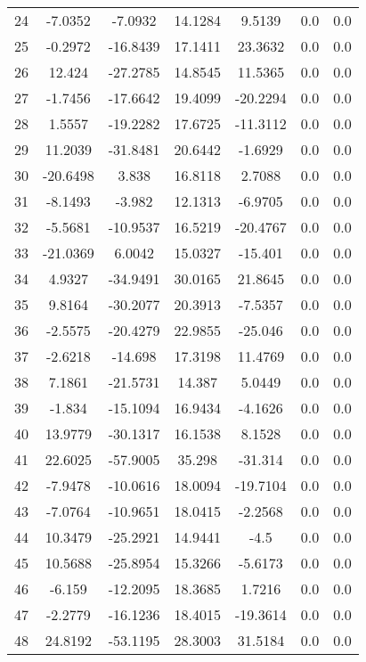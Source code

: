 \begin{table}
\begin{tabular}{ccccccc}
24 & -7.0352 & -7.0932 & 14.1284 & 9.5139 & 0.0 & 0.0 \\ 
25 & -0.2972 & -16.8439 & 17.1411 & 23.3632 & 0.0 & 0.0 \\ 
26 & 12.424 & -27.2785 & 14.8545 & 11.5365 & 0.0 & 0.0 \\ 
27 & -1.7456 & -17.6642 & 19.4099 & -20.2294 & 0.0 & 0.0 \\ 
28 & 1.5557 & -19.2282 & 17.6725 & -11.3112 & 0.0 & 0.0 \\ 
29 & 11.2039 & -31.8481 & 20.6442 & -1.6929 & 0.0 & 0.0 \\ 
30 & -20.6498 & 3.838 & 16.8118 & 2.7088 & 0.0 & 0.0 \\ 
31 & -8.1493 & -3.982 & 12.1313 & -6.9705 & 0.0 & 0.0 \\ 
32 & -5.5681 & -10.9537 & 16.5219 & -20.4767 & 0.0 & 0.0 \\ 
33 & -21.0369 & 6.0042 & 15.0327 & -15.401 & 0.0 & 0.0 \\ 
34 & 4.9327 & -34.9491 & 30.0165 & 21.8645 & 0.0 & 0.0 \\ 
35 & 9.8164 & -30.2077 & 20.3913 & -7.5357 & 0.0 & 0.0 \\ 
36 & -2.5575 & -20.4279 & 22.9855 & -25.046 & 0.0 & 0.0 \\ 
37 & -2.6218 & -14.698 & 17.3198 & 11.4769 & 0.0 & 0.0 \\ 
38 & 7.1861 & -21.5731 & 14.387 & 5.0449 & 0.0 & 0.0 \\ 
39 & -1.834 & -15.1094 & 16.9434 & -4.1626 & 0.0 & 0.0 \\ 
40 & 13.9779 & -30.1317 & 16.1538 & 8.1528 & 0.0 & 0.0 \\ 
41 & 22.6025 & -57.9005 & 35.298 & -31.314 & 0.0 & 0.0 \\ 
42 & -7.9478 & -10.0616 & 18.0094 & -19.7104 & 0.0 & 0.0 \\ 
43 & -7.0764 & -10.9651 & 18.0415 & -2.2568 & 0.0 & 0.0 \\ 
44 & 10.3479 & -25.2921 & 14.9441 & -4.5 & 0.0 & 0.0 \\ 
45 & 10.5688 & -25.8954 & 15.3266 & -5.6173 & 0.0 & 0.0 \\ 
46 & -6.159 & -12.2095 & 18.3685 & 1.7216 & 0.0 & 0.0 \\ 
47 & -2.2779 & -16.1236 & 18.4015 & -19.3614 & 0.0 & 0.0 \\ 
48 & 24.8192 & -53.1195 & 28.3003 & 31.5184 & 0.0 & 0.0 \\ 
\hline 

  \end{tabular}
\end{table}
